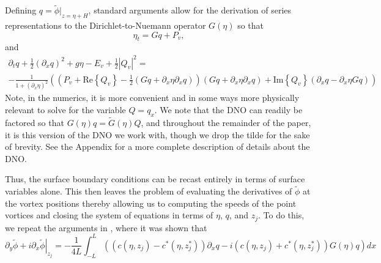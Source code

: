 \documentclass[a4paper,11pt]{article}
\newcommand{\p}{\partial}
\begin{document}
Defining $q = \tilde{\phi}|_{z=\eta+H}$, standard arguments \cite{craig,curtis} allow for the derivation of series representations to the Dirichlet-to-Nuemann operator $G(\eta)$ so that 
\[
\eta_{t} = Gq + P_{v},
\]
and 
\begin{multline*}
\p_{t}q + \frac{1}{2}\left(\p_{x}q\right)^{2} + g\eta - E_{v} + \frac{1}{2}\left|Q_{v}\right|^{2} =\\
- \frac{1}{1+(\p_{x}\eta)^{2}}\left(\left(P_{v}+\mbox{Re}\left\{Q_{v}\right\}-\frac{1}{2}\left(Gq+\p_{x}\eta\p_{x}q\right)\right)\left(Gq+\p_{x}\eta\p_{x}q\right) + \mbox{Im}\left\{Q_{v}\right\}(\p_{x}q - \p_{x}\eta Gq) \right) 
\end{multline*}
Note, in the numerics, it is more convenient and in some ways more physically relevant to solve for the variable $Q=q_{x}$.  We note that the DNO can readily be factored so that $G(\eta)q = \tilde{G}(\eta)Q$, and throughout the remainder of the paper, it is this version of the DNO we work with, though we drop the tilde for the sake of brevity.  See the Appendix for a more complete description of details about the DNO.  

Thus, the surface boundary conditions can be recast entirely in terms of surface variables alone.  This then leaves the problem of evaluating the derivatives of $\tilde{\phi}$ at the vortex positions thereby allowing us to computing the speeds of the point vortices and closing the system of equations in terms of $\eta$, $q$, and $z_{j}$.  To do this, we repeat the arguments in \cite{curtis}, where it was shown that 
\[
\left. \p_{y}\tilde{\phi} + i\p_{x}\tilde{\phi}\right|_{z_{j}} = -\frac{1}{4L}\int_{-L}^{L}\left((c(\eta,z_{j})-c^{\ast}(\eta,z^{\ast}_{j}))\p_{x}q - i(c(\eta,z_{j})+c^{\ast}(\eta,z^{\ast}_{j}))G(\eta)q \right)dx
\]
\end{document}
